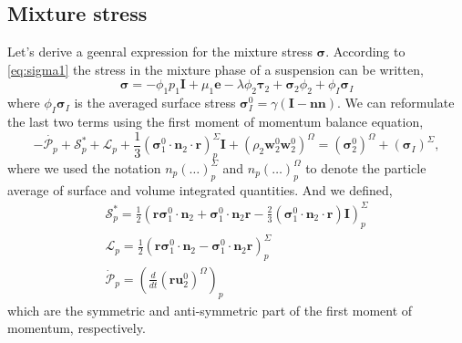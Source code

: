 \documentclass[12pt]{My_preprint}
\newcommand{\avgcond}[1]{\left<#1\right>}
\renewcommand{\avgcond}[1]{\overline{#1}}
\newcommand{\kavg}[1]{\avgcond{#1}^k}
\newcommand{\ddt}{\frac{d}{d t}}
\renewcommand{\ref}[1]{\autoref{#1}}
\begin{document}
\subsection*{Mixture stress}

Let's derive a geenral expression for the mixture stress $\bm{\sigma}$.
According to \ref{eq:sigma1}  the stress in the mixture phase of a suspension can be written,
\begin{equation}
    \bm{\sigma}
    = - \phi_1 p_1  \textbf{I}
    + \mu_1 \textbf{e}
    - \lambda \phi_2 \bm{\tau}_2
    + \bm{\sigma}_2 \phi_2 
    +\phi_I \bm{\sigma}_I 
    \label{eq:sigma}
\end{equation}
where $\phi_I \bm{\sigma}_I$ is the averaged surface stress $\bm{\sigma}_I^0 = \gamma (\textbf{I}  -  \textbf{nn})$.
We can reformulate the last two terms using the first moment of momentum balance equation, 
\begin{equation}
    -  \dot{\mathcal{P}_p}
    +  \mathscr{S}_p^*
    +  \mathscr{L}_p
    + \frac{1}{3}(\bm{\sigma}_1^0 \cdot \textbf{n}_2 \cdot \textbf{r})_p^\Sigma \textbf{I}
    + (\rho_2 \textbf{w}_2^0  \textbf{w}_2^0 )^\Omega
    =   (\bm{\sigma}_2^0)^\Omega
    + (\bm{\sigma}_I)^\Sigma,
\end{equation}
where we used the notation $n_p(\ldots)^\Sigma_p$ and $n_p(\ldots)^\Omega_p$ to denote the particle average of surface and volume integrated quantities. 
And we defined, 
\begin{align*}
    \mathscr{S}_p^* =\frac{1}{2}  (
        \textbf{r} \bm{\sigma}_1^0 \cdot \textbf{n}_2
        +  \bm{\sigma}_1^0 \cdot \textbf{n}_2\textbf{r}
        -
          \frac{2}{3}(\bm{\sigma}_1^0 \cdot \textbf{n}_2 \cdot \textbf{r})\textbf{I}
        )_p^\Sigma\\
    \mathscr{L}_p =\frac{1}{2} (
        \textbf{r} \bm{\sigma}_1^0 \cdot \textbf{n}_2
        - \bm{\sigma}_1^0 \cdot \textbf{n}_2\textbf{r}
        )_p^\Sigma\\
    \mathcal{\dot{P}}_p = \left(\ddt ( \textbf{r} \textbf{u}_2^0)^\Omega\right)_p
\end{align*}
which are the symmetric and anti-symmetric part of the first moment of momentum, respectively. 
\end{document}
